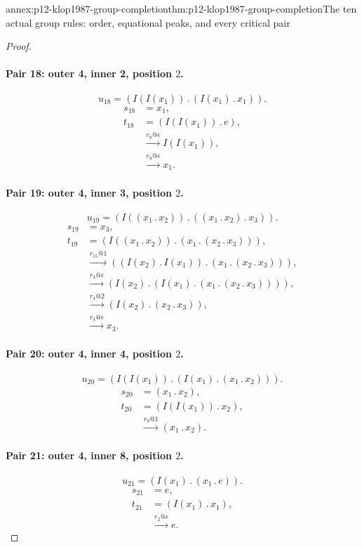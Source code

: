 \begin{annexitem}{annex:p12-klop1987-group-completion}{thm:p12-klop1987-group-completion}{The ten actual group rules: order, equational peaks, and every critical pair}
\begin{proof}
\paragraph{Pair 18: outer 4, inner 2, position \(2\).}
\[
 u_{18}=(I(I(x_{1}))\mathbin{.}(I(x_{1})\mathbin{.}x_{1})).
\]
\begin{align*}
 s_{18}&=x_{1},\\
 t_{18}&=(I(I(x_{1}))\mathbin{.}e),\\
 &\xrightarrow{r_{8}@\epsilon}I(I(x_{1})),\\
 &\xrightarrow{r_{9}@\epsilon}x_{1}.
\end{align*}

\paragraph{Pair 19: outer 4, inner 3, position \(2\).}
\[
 u_{19}=(I((x_{1}\mathbin{.}x_{2}))\mathbin{.}((x_{1}\mathbin{.}x_{2})\mathbin{.}x_{3})).
\]
\begin{align*}
 s_{19}&=x_{3},\\
 t_{19}&=(I((x_{1}\mathbin{.}x_{2}))\mathbin{.}(x_{1}\mathbin{.}(x_{2}\mathbin{.}x_{3}))),\\
 &\xrightarrow{r_{15}@1}((I(x_{2})\mathbin{.}I(x_{1}))\mathbin{.}(x_{1}\mathbin{.}(x_{2}\mathbin{.}x_{3}))),\\
 &\xrightarrow{r_{3}@\epsilon}(I(x_{2})\mathbin{.}(I(x_{1})\mathbin{.}(x_{1}\mathbin{.}(x_{2}\mathbin{.}x_{3})))),\\
 &\xrightarrow{r_{4}@2}(I(x_{2})\mathbin{.}(x_{2}\mathbin{.}x_{3})),\\
 &\xrightarrow{r_{4}@\epsilon}x_{3}.
\end{align*}

\paragraph{Pair 20: outer 4, inner 4, position \(2\).}
\[
 u_{20}=(I(I(x_{1}))\mathbin{.}(I(x_{1})\mathbin{.}(x_{1}\mathbin{.}x_{2}))).
\]
\begin{align*}
 s_{20}&=(x_{1}\mathbin{.}x_{2}),\\
 t_{20}&=(I(I(x_{1}))\mathbin{.}x_{2}),\\
 &\xrightarrow{r_{9}@1}(x_{1}\mathbin{.}x_{2}).
\end{align*}

\paragraph{Pair 21: outer 4, inner 8, position \(2\).}
\[
 u_{21}=(I(x_{1})\mathbin{.}(x_{1}\mathbin{.}e)).
\]
\begin{align*}
 s_{21}&=e,\\
 t_{21}&=(I(x_{1})\mathbin{.}x_{1}),\\
 &\xrightarrow{r_{2}@\epsilon}e.
\end{align*}


\end{proof}
\end{annexitem}
